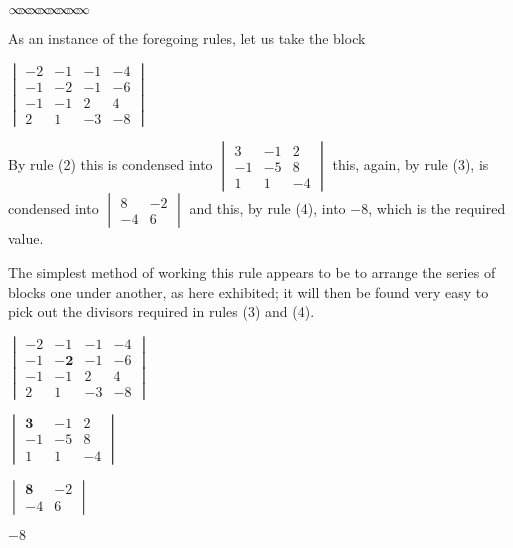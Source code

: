 \documentclass[11pt]{article}%
\theoremstyle{definition}
\newcommand{\sep}{\vspace{-3pt} \begin{center}
{\mathversion{normal}
$\infty \mspace{-5.5mu} \infty \mspace{-5.5mu}
\infty \mspace{-5.5mu} \infty \mspace{-5.5mu}
\infty \mspace{-5.5mu} \infty \mspace{-5.5mu}
\infty \mspace{-5.5mu} \infty$}
\end{center} \vspace{-3pt}}
\begin{document}
\sep


\bigskip\textsf{As an instance of the foregoing rules, let us take the block}

\begin{center}
$%
\begin{vmatrix}
-2 & -1 & -1 & -4\\
-1 & -2 & -1 & -6\\
-1 & -1 & 2 & 4\\
2 & 1 & -3 & -8
\end{vmatrix}
$
\end{center}

\textsf{\bigskip By rule (2) this is condensed into }$%
\begin{vmatrix}
3 & -1 & 2\\
-1 & -5 & 8\\
1 & 1 & -4
\end{vmatrix}
$\textsf{ this, again, by rule (3), is condensed into} $%
\begin{vmatrix}
8 & -2\\
-4 & 6
\end{vmatrix}
$ \textsf{and this, by rule (4), into }$-8$\textsf{, which is the required
value.}

\textsf{The simplest method of working this rule appears to be to arrange the
series of blocks one under another, as here exhibited; it will then be found
very easy to pick out the divisors required in rules (3) and (4).}

\begin{center}
$%
\begin{vmatrix}
-2 & -1 & -1 & -4\\
-1 & \mathbf{-2} & -1 & -6\\
-1 & -1 & 2 & 4\\
2 & 1 & -3 & -8
\end{vmatrix}
$

$%
\begin{vmatrix}
\mathbf{3} & -1 & 2\\
-1 & -5 & 8\\
1 & 1 & -4
\end{vmatrix}
$

\bigskip$%
\begin{vmatrix}
\mathbf{8} & -2\\
-4 & 6
\end{vmatrix}
$

\bigskip$-8$
\end{center}
\end{document}
